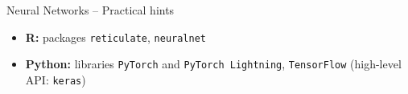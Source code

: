 \begin{frame}{Neural Networks -- Practical hints}
\medskip
 

\begin{itemize}
  \item \textbf{R:} packages \texttt{reticulate}, \texttt{neuralnet}
  \item \textbf{Python:} libraries \texttt{PyTorch} and \texttt{PyTorch 
  Lightning}, \texttt{TensorFlow} (high-level API: \texttt{keras})
\end{itemize}

\end{frame}

\undraft